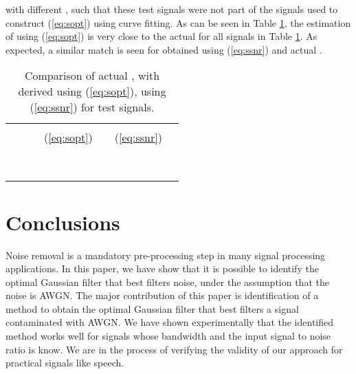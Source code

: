 \documentclass[journal,onecolumn]{IEEEtran}
\begin{document}
 with different , such that these test 
signals were not part of the signals used to
construct (\ref{eq:sopt}) using curve fitting.  As can be seen in Table
\ref{tab:table2}, the estimation of  using (\ref{eq:sopt}) is very
close to the actual  for all signals in Table \ref{tab:table2}. 
As expected, a similar match is seen for  obtained using 
(\ref{eq:ssnr}) and actual  .
\begin{small}
\begin{table}
\begin{center}
\begin{tabular}{|c|c|c|c|c|c|c|}
\hline \hline
 &  &  &
  &  &
 &  \\
 &  &  &  (\ref{eq:sopt}) &  & (\ref{eq:ssnr})&  \\
\hline \hline
 &  &  &  &  &  &  \\ \hline
 &  &  &  &  &  &  \\ \hline
 &  &  &  &  &  &  \\ \hline \hline 
 &  &  &  &  &  &  \\ \hline
 &  &  &  &  &  &  \\ \hline \hline
 &  &  & &  &  &  \\ \hline
 &  &  &  &  &  &  \\ \hline
 &  &  &  &  &  &  \\ \hline
\end{tabular}
\caption{Comparison of actual ,  with derived
 using (\ref{eq:sopt}),  using (\ref{eq:ssnr}) for test
signals.}
\label{tab:table2}
\end{center}
\end{table}
\end{small}

\section{Conclusions}
\label{sec:conclusions}

Noise removal is a mandatory pre-processing step in many signal processing
applications. In this paper, we have show that it is possible to identify the
optimal Gaussian filter that best filters noise, under the assumption that the
noise is AWGN. The major contribution of this paper is identification of a
method to obtain the optimal Gaussian filter that best filters a
signal contaminated with AWGN. We have shown experimentally that the identified
method works well for signals whose bandwidth and the input signal to noise ratio 
is know. 
We are in the process of verifying the validity of our approach for 
practical signals like speech.





\end{document}
